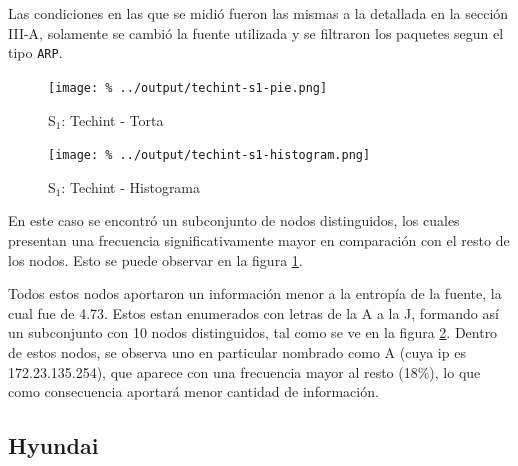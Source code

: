 \documentclass[final,inline,a4paper,narroweqnarray]{ieee}
\begin{document}
  Las condiciones en las que se midió fueron las mismas a la detallada en la
  sección III-A, solamente se cambió la fuente utilizada y se filtraron los
  paquetes segun el tipo \texttt{ARP}.  

    \begin{figure}[H]\begin{center}
      \texttt{[image: \%
      ../output/techint-s1-pie.png]}
      \vspace{-2em}
      \caption{S$_1$: Techint - Torta}
      \label{techint-s1-pie}
    \end{center}\end{figure}

    \begin{figure}[H]\begin{center}
      \texttt{[image: \%
      ../output/techint-s1-histogram.png]}
      \vspace{-2em}
      \caption{S$_1$: Techint - Histograma}
      \label{techint-s1-histogram}
    \end{center}\end{figure}
  
  En este caso se encontró un subconjunto de nodos distinguidos, los cuales
  presentan una frecuencia significativamente mayor en comparación con el
  resto de los nodos. Esto se puede observar en la figura
  \ref{techint-s1-pie}. 

  Todos estos nodos aportaron un información menor a la entropía de la
  fuente, la cual fue de 4.73. Estos estan enumerados con letras de la A a
  la J, formando así un subconjunto con 10 nodos distinguidos, tal como se
  ve en la figura \ref{techint-s1-histogram}. Dentro de estos nodos, se
  observa uno en particular nombrado como A (cuya ip es 172.23.135.254), que
  aparece con una frecuencia mayor al resto (18\%), lo que como consecuencia
  aportará menor cantidad de información.

  \subsection{Hyundai}
\end{document}
